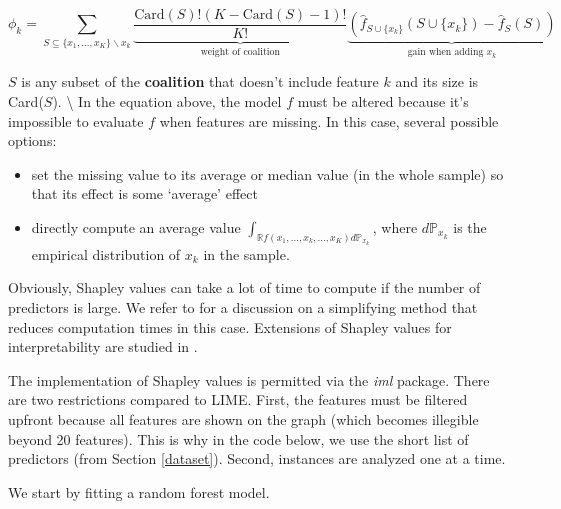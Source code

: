\documentclass[]{krantz}
\theoremstyle{definition}
\theoremstyle{definition}
\theoremstyle{definition}
\theoremstyle{remark}
\begin{document}
\begin{equation}
\label{eq:shapley} 
\phi_k=\sum_{S \subseteq \{x_1,\dots,x_K \} \backslash x_k}\underbrace{\frac{\text{Card}(S)!(K-\text{Card}(S)-1)!}{K!}}_{\text{weight of coalition}}\underbrace{\left(\hat{f}_{S \cup \{x_k\}}(S \cup \{x_k\})-\hat{f}_S(S)\right)}_{\text{gain when adding } x_k}
\end{equation}

\(S\) is any subset of the \textbf{coalition} that doesn't include
feature \(k\) and its size is Card(\(S\)). \textbackslash{} In the
equation above, the model \(f\) must be altered because it's impossible
to evaluate \(f\) when features are missing. In this case, several
possible options:

\begin{itemize}
\item set the missing value to its average or median value (in the whole sample) so that its effect is some `average' effect 
\item directly compute an average value $\int_{\mathbb{R} f(x_1,\dots,x_k,\dots,x_K)d\mathbb{P}_{x_k}}$, where $d\mathbb{P}_{x_k}$ is the empirical distribution of $x_k$ in the sample.
\end{itemize}

Obviously, Shapley values can take a lot of time to compute if the
number of predictors is large. We refer to \citet{chen2018shapley} for a
discussion on a simplifying method that reduces computation times in
this case. Extensions of Shapley values for interpretability are studied
in \citet{lundberg2017unified}.

The implementation of Shapley values is permitted via the \emph{iml}
package. There are two restrictions compared to LIME. First, the
features must be filtered upfront because all features are shown on the
graph (which becomes illegible beyond 20 features). This is why in the
code below, we use the short list of predictors (from Section
\ref{dataset}). Second, instances are analyzed one at a time.

We start by fitting a random forest model.

\footnotesize
\end{document}
